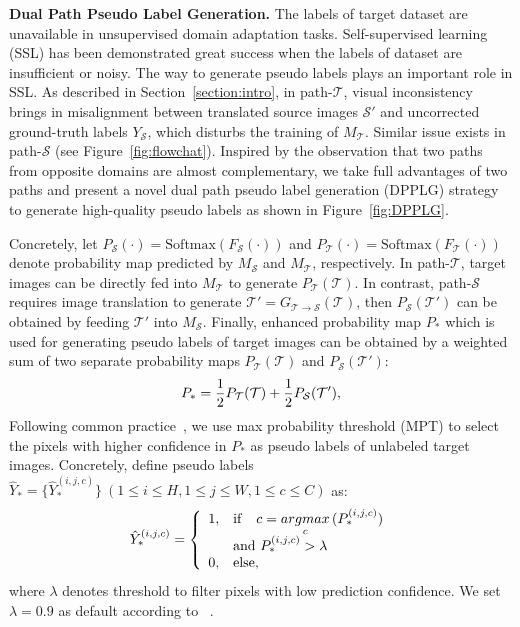 \documentclass[10pt,twocolumn,letterpaper]{article}
\begin{document}
{\noindent \textbf{Dual Path Pseudo Label Generation.}}\hspace{3pt}
The labels of target dataset are unavailable in unsupervised domain adaptation tasks. Self-supervised learning (SSL) has been demonstrated great success when the labels of dataset are insufficient or noisy. The way to generate pseudo labels plays an important role in SSL. As described in Section~\ref{section:intro}, in path-$\mathcal{T}$, visual inconsistency brings in misalignment between translated source images $\mathcal{S}'$ and uncorrected ground-truth labels $Y_\mathcal{S}$, which disturbs the training of $M_\mathcal{T}$. Similar issue exists in  path-$\mathcal{S}$ (see Figure~\ref{fig:flowchat}). Inspired by the observation that two paths from opposite domains are almost complementary, we take full advantages of two paths and present a novel dual path pseudo label generation (DPPLG) strategy to generate high-quality pseudo labels as shown in Figure~\ref{fig:DPPLG}.

Concretely, let $P_{\mathcal{S}}(\cdot) = \mbox{Softmax}(F_{\mathcal{S}}(\cdot))$ and $P_{\mathcal{T}}(\cdot) = \mbox{Softmax}(F_{\mathcal{T}}(\cdot))$ denote probability map predicted by $M_\mathcal{S}$ and $M_\mathcal{T}$, respectively. In path-$\mathcal{T}$, target images can be directly fed into $M_\mathcal{T}$ to generate $P_{\mathcal{T}}(\mathcal{T})$. In contrast, path-$\mathcal{S}$ requires image translation to generate $\mathcal{T}'= {G_{\mathcal{T}\rightarrow\mathcal{S}}}(\mathcal{T})$, then $P_{\mathcal{S}}(\mathcal{T}')$ can be obtained by feeding $\mathcal{T}'$ into $M_\mathcal{S}$. Finally, enhanced probability map $P_*$ which is used for generating pseudo labels of target images can be obtained by a weighted sum of two separate probability maps $P_{\mathcal{T}}(\mathcal{T})$ and $P_{\mathcal{S}}(\mathcal{T}')$:
\vspace{-0.2cm}
\begin{equation}
    {P_*}=\frac{1}{2} P_{\mathcal{T}}(\mathcal{T}) + \frac{1}{2} P_{\mathcal{S}}(\mathcal{T'}),
	\vspace{-0.2cm}
\end{equation}
Following common practice~\cite{li2019bidirectional, Two-phase}, we use max probability threshold (MPT) to select the pixels with higher confidence in $P_*$ as pseudo labels of unlabeled target images. Concretely, define pseudo labels $\hat{Y}_{*} = \{ \hat{Y}_{*}^{(i,j,c)}\}~(1 \leq i \leq H, 1 \leq j \leq W, 1 \leq c \leq C)$ as:
\vspace{-0.2cm}
\begin{equation}
\label{eq:sharepseudolabel}
 {\hat{Y}_*^{(i,j,c)}}=\left\{
 \begin{array}{ll}
 1, & {\rm if} \quad c=\mathop{argmax}\limits_{c} {({P_*^{(i,j,c)}})} \\
 & {\rm and} \ {P_*^{(i,j,c)}}>{\lambda} \\
0,& {\rm else},
\end{array}\\
\right.
\vspace{-0.1cm}
\end{equation}
where $\lambda$ denotes threshold to filter pixels with low prediction confidence. We set $\lambda=0.9$ as default according to ~\cite{li2019bidirectional}.
\end{document}
